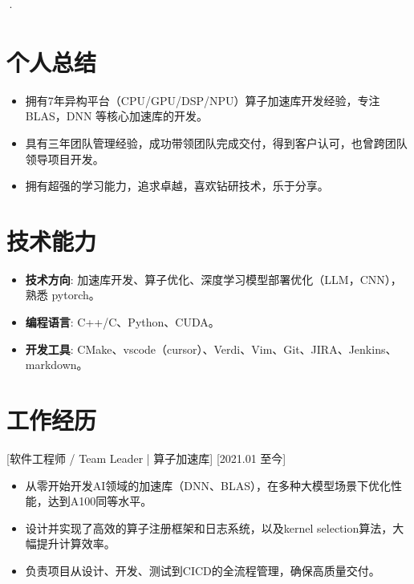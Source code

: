 \documentclass{resume}
\begin{document}


\ResumeTitle·

\section{个人总结}
\begin{itemize}
    \item 拥有7年异构平台（CPU/GPU/DSP/NPU）算子加速库开发经验，专注 BLAS，DNN 等核心加速库的开发。
    \item 具有三年团队管理经验，成功带领团队完成交付，得到客户认可，也曾跨团队领导项目开发。
    \item 拥有超强的学习能力，追求卓越，喜欢钻研技术，乐于分享。
\end{itemize}

\section{技术能力}
\begin{itemize}
    \item \textbf{技术方向}: 加速库开发、算子优化、深度学习模型部署优化（LLM，CNN），熟悉 pytorch。
    \item \textbf{编程语言}: C++/C、Python、CUDA。
    \item \textbf{开发工具}: CMake、vscode（cursor）、Verdi、Vim、Git、JIRA、Jenkins、markdown。
\end{itemize}


\section{工作经历}

[软件工程师 / Team Leader | 算子加速库]
[2021.01 至今]
\begin{itemize}
    \item 从零开始开发AI领域的加速库（DNN、BLAS），在多种大模型场景下优化性能，达到A100同等水平。
    \item 设计并实现了高效的算子注册框架和日志系统，以及kernel selection算法，大幅提升计算效率。
    \item 负责项目从设计、开发、测试到CICD的全流程管理，确保高质量交付。
\end{itemize}
\end{document}
